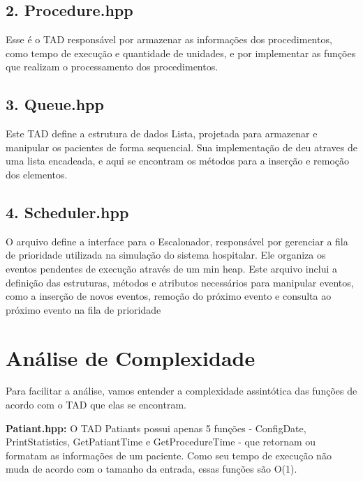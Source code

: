 \documentclass[11pt]{article}
\begin{document}
\subsection*{2. Procedure.hpp}
\par Esse é o TAD responsável por armazenar as informações dos procedimentos, como tempo de execução e quantidade de unidades, e por implementar as funções que realizam o processamento dos procedimentos.

\subsection*{3. Queue.hpp}
\par Este TAD define a estrutura de dados Lista, projetada para armazenar e manipular os pacientes de forma sequencial. Sua implementação de deu atraves de uma lista encadeada, e aqui se encontram os métodos para a inserção e remoção dos elementos.

\subsection*{4. Scheduler.hpp}
\par O arquivo define a interface para o Escalonador, responsável por gerenciar a fila de prioridade utilizada na simulação do sistema hospitalar. Ele organiza os eventos pendentes de execução através de um min heap. Este arquivo inclui a definição das estruturas, métodos e atributos necessários para manipular eventos, como a inserção de novos eventos, remoção do próximo evento e consulta ao próximo evento na fila de prioridade


\section*{Análise de Complexidade}
    \par Para facilitar a análise, vamos entender a complexidade assintótica das funções de acordo com o TAD que elas se encontram.

    \par\textbf{Patiant.hpp:} O TAD Patiants possui apenas 5 funções  - ConfigDate, PrintStatistics, GetPatiantTime e GetProcedureTime - que retornam ou formatam as informações de um paciente. Como seu tempo de execução não muda de acordo com o tamanho da entrada, essas funções são O(1).
\end{document}
